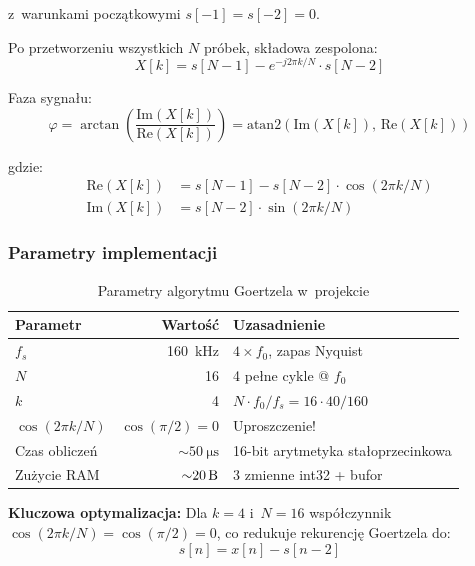 \documentclass[a4paper,11pt]{article}
\begin{document}
z~warunkami początkowymi $s[-1] = s[-2] = 0$.

Po przetworzeniu wszystkich $N$ próbek, składowa zespolona:
\begin{equation}
    X[k] = s[N-1] - e^{-j2\pi k/N} \cdot s[N-2]
    \label{eq:goertzel_result}
\end{equation}

Faza sygnału:
\begin{equation}
    \varphi = \arctan\!\left(\frac{\text{Im}(X[k])}{\text{Re}(X[k])}\right)
    = \text{atan2}\!\left(\text{Im}(X[k]),\, \text{Re}(X[k])\right)
    \label{eq:goertzel_phase}
\end{equation}

gdzie:
\begin{align}
    \text{Re}(X[k]) &= s[N-1] - s[N-2] \cdot \cos(2\pi k / N) \label{eq:re} \\
    \text{Im}(X[k]) &= s[N-2] \cdot \sin(2\pi k / N) \label{eq:im}
\end{align}

\subsubsection{Parametry implementacji}

\begin{table}[H]
    \centering
    \caption{Parametry algorytmu Goertzela w~projekcie}
    \label{tab:goertzel_params}
    \begin{tabular}{lrl}
        \toprule
        \textbf{Parametr} & \textbf{Wartość} & \textbf{Uzasadnienie} \\
        \midrule
        $f_s$ & \SI{160}{\kilo\hertz} & $4 \times f_0$, zapas Nyquist \\
        $N$ & 16 & 4 pełne cykle @ $f_0$ \\
        $k$ & 4 & $N \cdot f_0/f_s = 16 \cdot 40/160$ \\
        $\cos(2\pi k/N)$ & $\cos(\pi/2) = 0$ & Uproszczenie! \\
        Czas obliczeń & ${\sim}\SI{50}{\micro\second}$ & 16-bit arytmetyka stałoprzecinkowa \\
        Zużycie RAM & ${\sim}\SI{20}{\byte}$ & 3 zmienne int32 + bufor \\
        \bottomrule
    \end{tabular}
\end{table}

\textbf{Kluczowa optymalizacja:} Dla $k = 4$ i~$N = 16$ współczynnik
$\cos(2\pi k/N) = \cos(\pi/2) = 0$, co redukuje rekurencję Goertzela do:
\begin{equation}
    s[n] = x[n] - s[n-2]
    \label{eq:goertzel_simplified}
\end{equation}
\end{document}
